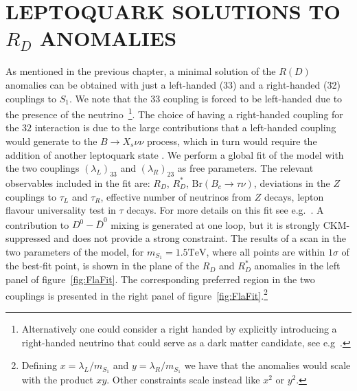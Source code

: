 \documentclass[11pt]{cernrep}
\def\sss{\scriptscriptstyle}
\begin{document}
\section{LEPTOQUARK SOLUTIONS TO  $R_D$ ANOMALIES}

As mentioned in the previous chapter, a minimal solution of the $R(D)$ anomalies can be obtained with just a left-handed (33) and a right-handed (32) couplings to $S_1$. We note that the $33$ coupling is forced to be left-handed due to the presence of the neutrino~\footnote{Alternatively one could consider a right handed by explicitly introducing a right-handed neutrino that could serve as a dark matter candidate, see e.g~\cite{Azatov:2018kzb}.}. The choice of having a right-handed coupling for the $32$ interaction is due to the large contributions that a left-handed coupling would generate to the $B \to X_s \nu \nu$ process, which in turn would require the addition of another leptoquark state \cite{Crivellin:2017zlb,Buttazzo:2017ixm,Marzocca:2018wcf,Crivellin:2019dwb}.
%
We perform a global fit of the model with the two couplings $(\lambda_{\sss L})_{33}$ and $(\lambda_{\sss R})_{23}$ as free parameters. The relevant observables included in the fit are: $R_D$, $R_D^*$, $\text{Br}(B_c \to \tau \nu)$, deviations in the $Z$ couplings to $\tau_L$ and $\tau_R$, effective number of neutrinos from $Z$ decays, lepton flavour universality test in $\tau$ decays. For more details on this fit see e.g.~\cite{Buttazzo:2017ixm,Marzocca:2018wcf,Azatov:2018kzb}. A contribution to $D^0 - \bar{D}^0$ mixing is generated at one loop, but it is strongly CKM-suppressed and does not provide a strong constraint.
The results of a scan in the two parameters of the model, for $m_{S_1} = 1.5 \text{TeV}$, where all points are within $1\sigma$ of the best-fit point, is shown in the plane of the $R_D$ and $R_D^*$ anomalies in the left panel of figure~\ref{fig:FlaFit}. The corresponding preferred region in the two couplings is presented in the right panel of figure~\ref{fig:FlaFit}.\footnote{Defining $x= \lambda_L / m_{S_1}$ and $y= \lambda_R / m_{S_1}$ we have that the anomalies would scale with the product $xy$. Other constraints scale instead like $x^2$ or $y^2$.}
\end{document}
